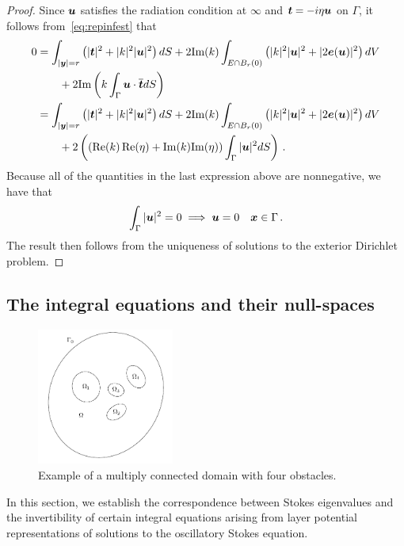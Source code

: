 \begin{proof}
Since ${\boldsymbol u}$ satisfies the radiation condition at $\infty$ and ${\boldsymbol t} = -i\eta {\boldsymbol u}$
on $\Gamma$, it follows from~\cref{eq:repinfest} that
\begin{align*}
0 &=
\int_{|{\boldsymbol y}|=r} \left( |{\boldsymbol t}|^2 + |k|^2 |{\boldsymbol u}|^2 \right) dS +
2 \text{Im}(k) \int_{E \cap B_{r}(0)} \left(|k|^2 |{\boldsymbol u}|^2 + |2{\boldsymbol e}({\boldsymbol u})|^2 \right)
dV \nonumber \\
& \qquad + 2 \text{Im} \left( k \int_{\Gamma} {\boldsymbol u} \cdot \overline{{\boldsymbol t}} dS  \right) \\
&= 
\int_{|{\boldsymbol y}|=r} \left( |{\boldsymbol t}|^2 + |k|^2 |{\boldsymbol u}|^2 \right) dS +
2 \text{Im}(k) \int_{E \cap B_{r}(0)} \left(|k|^2 |{\boldsymbol u}|^2 + |2{\boldsymbol e}({\boldsymbol u})|^2 \right)
dV \nonumber \\
& \qquad + 2 \left( \left (\operatorname{Re}(k)\operatorname{Re}(\eta) + {\textrm{\textup{Im}}}(k){\textrm{\textup{Im}}}(\eta)
\right ) \int_{\Gamma} |{\boldsymbol u}|^{2} dS  \right)
\, .
\end{align*}
Because all of the quantities in the last expression above are
nonnegative, we have that
\begin{equation}
  \int_{\Gamma} |{\boldsymbol u}|^{2} = 0 \implies {\boldsymbol u} = 0  \quad {\boldsymbol x} \in \Gamma \, .
  \nonumber
\end{equation}
The result then follows from the uniqueness of solutions to the exterior
Dirichlet problem.
\end{proof}

\subsection{The integral equations and their null-spaces}

\begin{figure}
\begin{center}
\includegraphics[width=0.4\textwidth]{fig/mc_dom}
\end{center}
\caption{Example of a multiply connected domain with four obstacles.}
\label{fig:mc_dom}
\end{figure}

In this section, we establish the correspondence between
Stokes eigenvalues and the invertibility of certain integral
equations arising from layer potential representations
of solutions to the oscillatory Stokes equation.

